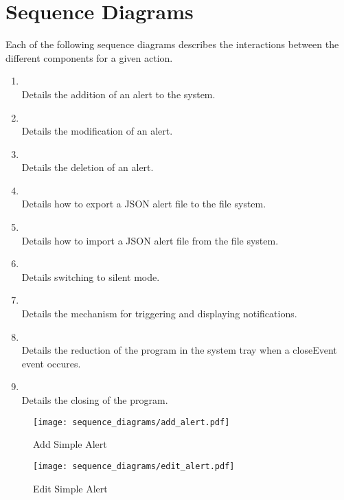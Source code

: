 \chapter{Sequence Diagrams}\label{ch:sequence_diagrams}
Each of the following sequence diagrams describes the interactions between the different components for a given action.\\
\begin{enumerate}
    \item~\\Details the addition of an alert to the system.
    \item~\\Details the modification of an alert.
    \item~\\Details the deletion of an alert.
    \item~\\Details how to export a JSON alert file to the file system.
    \item~\\Details how to import a JSON alert file from the file system.
    \item~\\Details switching to silent mode.
    \item~\\Details the mechanism for triggering and displaying notifications.
    \item~\\Details the reduction of the program in the system tray when a closeEvent event occures.
    \item~\\Details the closing of the program.
\end{enumerate}

\begin{figure}[]
	\centering
    \caption{Add Simple Alert}\label{fig:sd_add_simple_alert}
    \texttt{[image: sequence\_diagrams/add\_alert.pdf]}
\end{figure}

\begin{figure}[]
	\centering
    \caption{Edit Simple Alert}\label{fig:sd_edit_simple_alert}
    \texttt{[image: sequence\_diagrams/edit\_alert.pdf]}
\end{figure}

